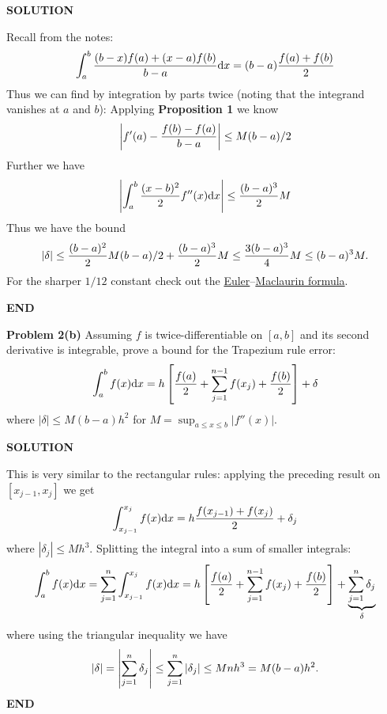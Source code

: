\documentclass[12pt,a4paper]{article}
\def\endash{–}
\begin{document}
\textbf{SOLUTION}

Recall from the notes:
\[
\int_a^b {(b-x) f(a) + (x-a) f(b) \over b-a} {\rm d} x = (b-a) {f(a) + f(b) \over 2}
\]
Thus we can find by integration by parts twice (noting that the integrand vanishes at $a$ and $b$):
Applying \textbf{Proposition 1} we know
\[
\left|{f'(a) - {f(b)-f(a) \over b-a}}\right| \leq M (b-a)/2
\]
Further we have
\[
\left|{\int_a^b {(x-b)^2 \over 2} f''(x) {\rm d}x }\right| \leq {(b-a)^3 \over 2} M
\]
Thus we have the bound
\[
|\ensuremath{\delta}| \ensuremath{\leq} {(b-a)^2 \over 2} M (b-a)/2 + {(b-a)^3 \over 2} M \ensuremath{\leq} {3 (b-a)^3 \over 4} M \ensuremath{\leq} (b-a)^3 M.
\]
For the sharper $1/12$ constant check out the \href{https://en.wikipedia.org/wiki/Euler\ensuremath{\endash}Maclaurin_formula}{Euler\ensuremath{\endash}Maclaurin formula}.

\textbf{END}

\textbf{Problem 2(b)} Assuming $f$ is twice-differentiable on $[a,b]$ and its second derivative is integrable, prove a bound for the Trapezium rule error:
\[
\ensuremath{\int}_a^b f(x) {\rm d}x = h \br[{f(a) \over 2} + \ensuremath{\sum}_{j=1}^{n-1} f(x_j) + {f(b) \over 2}] +  \ensuremath{\delta}
\]
where $|\ensuremath{\delta}| \ensuremath{\leq} M (b-a) h^2$ for $M = \sup_{a \ensuremath{\leq} x \ensuremath{\leq} b}|f''(x)|$.

\textbf{SOLUTION}

This is very similar to the rectangular rules: applying the preceding result on $[x_{j-1},x_j]$ we get
\[
\ensuremath{\int}_{x_{j-1}}^{x_j} f(x) {\rm d}x = h {f(x_{j-1}) + f(x_j) \over 2} + \ensuremath{\delta}_j
\]
where $|\ensuremath{\delta}_j| \ensuremath{\leq} M h^3$. Splitting the integral into a sum of smaller integrals:
\[
\ensuremath{\int}_a^b f(x) {\rm d}x = \ensuremath{\sum}_{j=1}^n  \ensuremath{\int}_{x_{j-1}}^{x_j} f(x) {\rm d}x =
h \br[{f(a) \over 2} + \ensuremath{\sum}_{j=1}^{n-1} f(x_j) + {f(b) \over 2}] +  \underbrace{\ensuremath{\sum}_{j=1}^n \ensuremath{\delta}_j}_\ensuremath{\delta}
\]
where using the triangular inequality we have
\[
|\delta| = \left|{ \sum_{j=1}^n \delta_j}\right| \leq \sum_{j=1}^n |\delta_j| \leq M n h^3 = M(b-a) h^2.
\]
\textbf{END}
\end{document}
